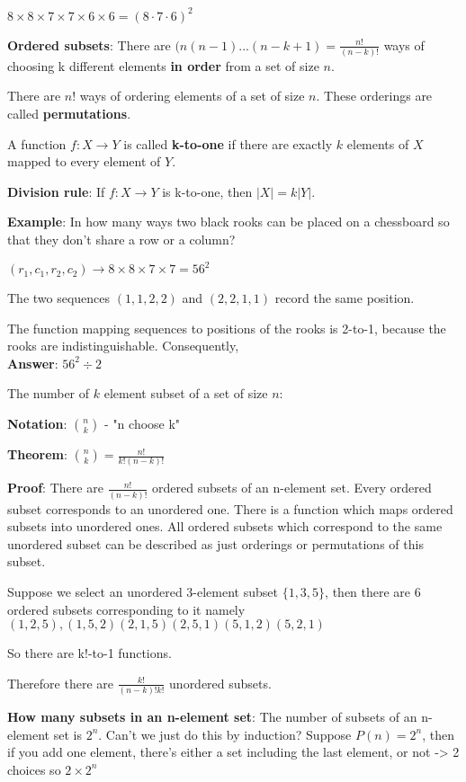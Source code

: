 \documentclass[9pt, letterpaper, oneside]{article}
\begin{document}
$8 \times 8 \times 7 \times 7 \times 6 \times 6 = (8 \cdot 7 \cdot 6)^2$

\textbf{Ordered subsets}: There are $(n(n-1)...(n-k+1) = \frac{n!}{(n-k)!}$ ways of choosing k different elements \textbf{in order} from a set of size $n$.

There are $n!$ ways of ordering elements of a set of size $n$.  These orderings are called \textbf{permutations}.

A function $f: X \to Y$ is called \textbf{k-to-one} if there are exactly $k$ elements of $X$ mapped to every element of $Y$.

\textbf{Division rule}: If $f: X \to Y$ is k-to-one, then $|X| = k|Y|$.

\textbf{Example}: In how many ways two black rooks can be placed on a chessboard so that they don't share a row or a column?

$(r_1, c_1, r_2, c_2) \to 8 \times 8 \times 7 \times 7 = 56^2$ 

The two sequences $(1,1,2,2)$ and $(2,2,1,1)$ record the same position. 

The function mapping sequences to positions of the rooks is 2-to-1, because the rooks are indistinguishable. Consequently,\\
\textbf{Answer}: $56^2 \div 2$

The number of $k$ element subset of a set of size $n$:

\textbf{Notation}: ${n \choose k}$ - "n choose k"

\textbf{Theorem}: ${n \choose k} = \frac{n!}{k!(n-k)!}$ 

\textbf{Proof}: There are $\frac{n!}{(n-k)!}$ ordered subsets of an n-element set. Every ordered subset corresponds to an unordered one. There is a function which maps ordered subsets into unordered ones.
All ordered subsets which correspond to the same unordered subset can be described as just orderings or permutations of this subset.

Suppose we select an unordered 3-element subset $\{1,3,5\}$, then there are 6 ordered subsets corresponding to it namely $(1,2,5), (1,5,2) (2,1,5) (2,5,1) (5, 1, 2) (5,2,1)$

So there are k!-to-1 functions.

Therefore there are $\frac{k!}{(n-k)!k!}$ unordered subsets.

\textbf{How many subsets in an n-element set}: The number of subsets of an n-element set is $2^n$. Can't we just do this by induction?
Suppose $P(n) = 2^n$, then if you add one element, there's either a set including the last element, or not -> 2 choices so $2 \times 2^{n}$
\end{document}
